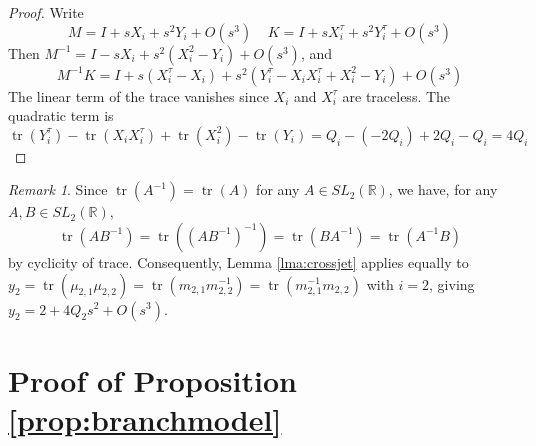 \documentclass{article}
\DeclareMathOperator{\tr}{tr}
\theoremstyle{plain}
\theoremstyle{definition}
\theoremstyle{plain}
\theoremstyle{plain}
\theoremstyle{plain}
\theoremstyle{remark}
\newtheorem{remark}[theorem]{Remark}
\theoremstyle{remark}
\theoremstyle{plain}
\theoremstyle{plain}
\theoremstyle{plain}
\theoremstyle{plain}
\begin{document}
\begin{proof}
Write 
\begin{equation*}
	M = I + sX_i + s^2Y_i + O(s^3) \ \ \ \ \ K = I + sX_i^\tau + s^2Y_i^\tau + O(s^3)
\end{equation*}
Then $M^{-1} = I - sX_i + s^2(X_i^2 - Y_i) + O(s^3)$, and 
\begin{equation*}
	M^{-1}K = I + s(X_i^\tau - X_i) + s^2(Y_i^\tau - X_iX_i^\tau + X_i^2 - Y_i) + O(s^3)
\end{equation*}
The linear term of the trace vanishes since $X_i$ and $X_i^\tau$ are traceless. The quadratic term is 
\begin{equation*}
	\tr(Y_i^\tau) - \tr(X_iX_i^\tau) + \tr(X_i^2) - \tr(Y_i) = Q_i - (-2Q_i) + 2Q_i - Q_i = 4Q_i
\end{equation*}
\end{proof}

\begin{remark}
Since $\tr(A^{-1}) = \tr(A)$ for any $A \in SL_2(\mathbb R)$, we have, for any $A, B \in SL_2(\mathbb R)$,
\begin{equation*}
	\tr(AB^{-1}) = \tr((AB^{-1})^{-1}) = \tr(BA^{-1}) = \tr(A^{-1}B)
\end{equation*}
by cyclicity of trace. Consequently, Lemma \ref{lma:crossjet} applies equally to $y_2 = \tr(\mu_{2,1}\mu_{2,2}) = \tr(m_{2,1}m_{2,2}^{-1}) = \tr(m_{2,1}^{-1}m_{2,2})$ with $i = 2$, giving $y_2 = 2 + 4Q_2s^2 + O(s^3)$.
\end{remark}

\section{Proof of Proposition \ref{prop:branchmodel}}\label{sec:algebra}
\end{document}
